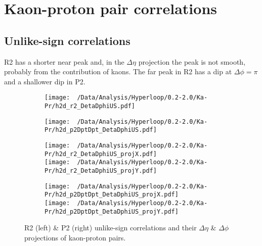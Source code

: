 \documentclass[12pt,a4paper,twoside]{report}
\begin{document}
\section{Kaon-proton pair correlations}
\subsection{Unlike-sign correlations}
R2 has a shorter near peak and, in the $\Delta\eta$ projection the peak is not smooth, probably from the contribution of kaons. The far peak in R2 has a dip at $\Delta\phi=\pi$ and a shallower dip in P2.
\begin{figure}[H]
	\begin{subfigure}{0.49\linewidth}
		\texttt{[image: ~/Data/Analysis/Hyperloop/0.2-2.0/Ka-Pr/h2d\_r2\_DetaDphiUS.pdf]}\\
	\end{subfigure}
	\begin{subfigure}{0.49\linewidth}
		\texttt{[image: ~/Data/Analysis/Hyperloop/0.2-2.0/Ka-Pr/h2d\_p2DptDpt\_DetaDphiUS.pdf]}\\
	\end{subfigure}
\end{figure}
\begin{figure}[H]
	\ContinuedFloat
	\begin{subfigure}{0.49\linewidth}
		\texttt{[image: ~/Data/Analysis/Hyperloop/0.2-2.0/Ka-Pr/h2d\_r2\_DetaDphiUS\_projX.pdf]}\\
		\texttt{[image: ~/Data/Analysis/Hyperloop/0.2-2.0/Ka-Pr/h2d\_r2\_DetaDphiUS\_projY.pdf]}\\
	\end{subfigure}
	\begin{subfigure}{0.49\linewidth}
		\texttt{[image: ~/Data/Analysis/Hyperloop/0.2-2.0/Ka-Pr/h2d\_p2DptDpt\_DetaDphiUS\_projX.pdf]}\\
		\texttt{[image: ~/Data/Analysis/Hyperloop/0.2-2.0/Ka-Pr/h2d\_p2DptDpt\_DetaDphiUS\_projY.pdf]}\\
	\end{subfigure}
	\caption{R2 (left) \& P2 (right) unlike-sign correlations and their $\Delta\eta$ \& $\Delta\phi$ projections of kaon-proton pairs.}
\end{figure}
\end{document}
